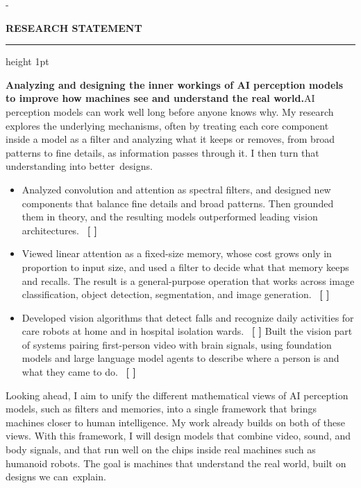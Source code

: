 \documentclass[11pt,a4paper]{article}
\makeatletter
\newcommand{\keepspace}[1]{\par\penalty\z@\begingroup\setlength{\dimen@}{#1}%
  \dimen@ii\pagegoal\advance\dimen@ii-\pagetotal
  \ifdim\dimen@>\dimen@ii\ifdim\dimen@ii>\z@\vfill\fi\break\fi\endgroup}
\newcommand{\cvsection}[2][8]{\par\vspace{8pt}\keepspace{#1\baselineskip}%
  {\color{cvblue}\large\bfseries\MakeUppercase{#2}\par}\vspace{3pt}%
  {\color{cvblue}\hrule height 1pt}\vspace{8pt}}
\newcommand{\rt}[1]{\unskip~{\color{cvblue}\scriptsize\bfseries[%
  \def\rt@sep{\def\rt@sep{,~}}%
  \renewcommand*{\do}[1]{\rt@sep\hyperlink{pub:##1}{##1}}\docsvlist{#1}]}}
\makeatother
\begin{document}
\cvsection{Research Statement}
{\linespread{1.3}\selectfont\raggedright
\textbf{Analyzing and designing the inner workings of AI perception models to improve how
machines see and understand the real world.}\enspace AI perception models can work well long before anyone knows why. My research explores the underlying mechanisms, often by treating each core
component inside a model as a filter and analyzing what it keeps or removes, from broad patterns to fine details, as information passes through it. I then turn that understanding into better~designs.
\begin{itemize}[itemsep=5pt, topsep=6pt]
  \item Analyzed convolution and attention as spectral filters, and designed new components that balance
        fine details and broad patterns. Then grounded them in theory, and the resulting models outperformed leading vision architectures. \rt{1, 4}
  \item Viewed linear attention as a fixed-size memory, whose cost grows only in proportion to input size, and used a filter to decide what that memory keeps and recalls. The result is a general-purpose
        operation that works across image classification, object detection, segmentation, and
        image generation. \rt{11}
  \item Developed vision algorithms that detect falls and recognize daily activities for care
        robots at home and in hospital isolation wards. \rt{5, 6, 8, 9} Built the vision part of
        systems pairing first-person video with brain signals, using foundation models and large
        language model agents to describe where a person is and what they came to do. \rt{2, 3}
\end{itemize}
Looking ahead, I aim to unify the different mathematical views of AI perception models, such as filters and memories, into a single framework that brings machines closer to human intelligence.
My work already builds on both of these views. With this framework, I will design models that
combine video, sound, and body signals, and that run well on the chips inside real machines such
as humanoid robots. The goal is machines that understand the real world, built on designs we can~explain.\par}
\end{document}
